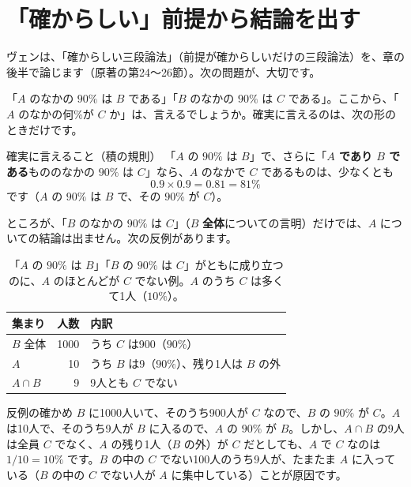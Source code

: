 \documentclass[a4paper,11pt,openany]{ltjsbook}
\begin{document}
\section{「確からしい」前提から結論を出す}

ヴェンは、「確からしい三段論法」（前提が確からしいだけの三段論法）を、章の後半で論じます（原著の第24〜26節）。次の問題が、大切です。

「$A$ のなかの $90\%$ は $B$ である」「$B$ のなかの $90\%$ は $C$ である」。ここから、「$A$ のなかの何\%が $C$ か」は、言えるでしょうか。確実に言えるのは、次の形のときだけです。

\begin{examplebox}{確実に言えること（積の規則）}
「$A$ の $90\%$ は $B$」で、さらに「\textbf{$A$ であり $B$ である}もののなかの $90\%$ は $C$」なら、$A$ のなかで $C$ であるものは、少なくとも
\[
0.9\times0.9=0.81=81\%
\]
です（$A$ の $90\%$ は $B$ で、その $90\%$ が $C$）。
\end{examplebox}

ところが、「$B$ のなかの $90\%$ は $C$」（$B$ \textbf{全体}についての言明）だけでは、$A$ についての結論は出ません。次の反例があります。

\begin{table}[htbp]
\centering
\begin{tabular}{lrl}
\toprule
集まり & 人数 & 内訳\\
\midrule
$B$ 全体 & 1000 & うち $C$ は900（$90\%$）\\
$A$ & 10 & うち $B$ は9（$90\%$）、残り1人は $B$ の外\\
$A\cap B$ & 9 & 9人とも $C$ でない\\
\bottomrule
\end{tabular}
\caption{「$A$ の $90\%$ は $B$」「$B$ の $90\%$ は $C$」がともに成り立つのに、$A$ のほとんどが $C$ でない例。$A$ のうち $C$ は多くて1人（$10\%$）。}
\end{table}

\begin{examplebox}{反例の確かめ}
$B$ に1000人いて、そのうち900人が $C$ なので、$B$ の $90\%$ が $C$。$A$ は10人で、そのうち9人が $B$ に入るので、$A$ の $90\%$ が $B$。しかし、$A\cap B$ の9人は全員 $C$ でなく、$A$ の残り1人（$B$ の外）が $C$ だとしても、$A$ で $C$ なのは $1/10=10\%$ です。$B$ の中の $C$ でない100人のうち9人が、たまたま $A$ に入っている（$B$ の中の $C$ でない人が $A$ に集中している）ことが原因です。
\end{examplebox}
\end{document}
